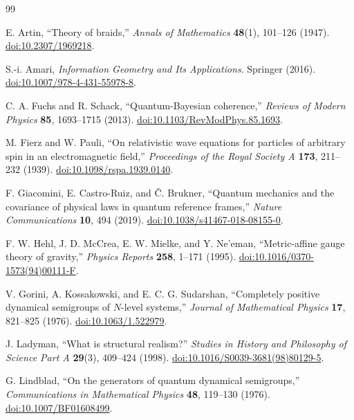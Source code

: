 \documentclass[11pt]{article}
\theoremstyle{definition}
\theoremstyle{remark}
\begin{document}
\begin{thebibliography}{99}
\raggedright
\small

E. Artin, ``Theory of braids,'' \emph{Annals of Mathematics} \textbf{48}(1), 101--126 (1947). \href{https://doi.org/10.2307/1969218}{doi:10.2307/1969218}.

S.-i. Amari, \emph{Information Geometry and Its Applications}. Springer (2016). \href{https://doi.org/10.1007/978-4-431-55978-8}{doi:10.1007/978-4-431-55978-8}.

C. A. Fuchs and R. Schack, ``Quantum-Bayesian coherence,'' \emph{Reviews of Modern Physics} \textbf{85}, 1693--1715 (2013). \href{https://doi.org/10.1103/RevModPhys.85.1693}{doi:10.1103/RevModPhys.85.1693}.

M. Fierz and W. Pauli, ``On relativistic wave equations for particles of arbitrary spin in an electromagnetic field,'' \emph{Proceedings of the Royal Society A} \textbf{173}, 211--232 (1939). \href{https://doi.org/10.1098/rspa.1939.0140}{doi:10.1098/rspa.1939.0140}.

F. Giacomini, E. Castro-Ruiz, and \v{C}. Brukner, ``Quantum mechanics and the covariance of physical laws in quantum reference frames,'' \emph{Nature Communications} \textbf{10}, 494 (2019). \href{https://doi.org/10.1038/s41467-018-08155-0}{doi:10.1038/s41467-018-08155-0}.

F. W. Hehl, J. D. McCrea, E. W. Mielke, and Y. Ne'eman, ``Metric-affine gauge theory of gravity,'' \emph{Physics Reports} \textbf{258}, 1--171 (1995). \href{https://doi.org/10.1016/0370-1573(94)00111-F}{doi:10.1016/0370-1573(94)00111-F}.

V. Gorini, A. Kossakowski, and E. C. G. Sudarshan, ``Completely positive dynamical semigroups of $N$-level systems,'' \emph{Journal of Mathematical Physics} \textbf{17}, 821--825 (1976). \href{https://doi.org/10.1063/1.522979}{doi:10.1063/1.522979}.

J. Ladyman, ``What is structural realism?'' \emph{Studies in History and Philosophy of Science Part A} \textbf{29}(3), 409--424 (1998). \href{https://doi.org/10.1016/S0039-3681(98)80129-5}{doi:10.1016/S0039-3681(98)80129-5}.

G. Lindblad, ``On the generators of quantum dynamical semigroups,'' \emph{Communications in Mathematical Physics} \textbf{48}, 119--130 (1976). \href{https://doi.org/10.1007/BF01608499}{doi:10.1007/BF01608499}.


\end{thebibliography}
\end{document}
